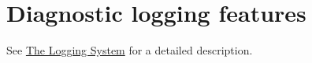 \hypertarget{group__group___logging}{}\section{Diagnostic logging features}
\label{group__group___logging}
See \hyperlink{page_Logging}{The Logging System} for a detailed description. 